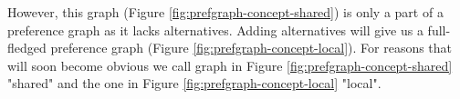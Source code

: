 However, this graph (Figure \ref{fig:prefgraph-concept-shared}) is only a part of a preference graph as it lacks
alternatives. Adding alternatives will give us a full-fledged preference graph (Figure
\ref{fig:prefgraph-concept-local}). For reasons that will soon become obvious we call graph in Figure
\ref{fig:prefgraph-concept-shared} "shared" and the one in Figure \ref{fig:prefgraph-concept-local} "local".

